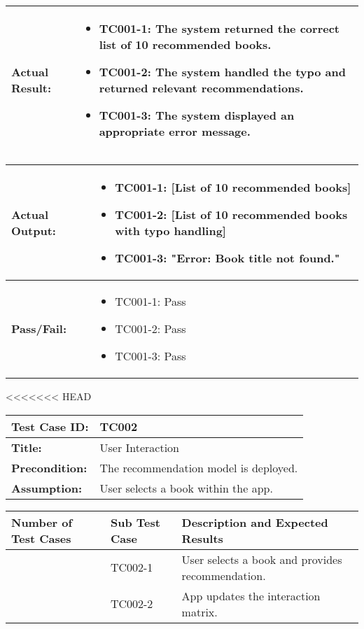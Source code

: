 \documentclass{article}
\begin{document}
\noindent
\begin{tabularx}{\textwidth}{|>{\raggedright\arraybackslash}p{4cm}|X|}
    \hline
    \textbf{Actual Result:} & 
    \begin{itemize}
        \item TC001-1: The system returned the correct list of 10 recommended books.
        \item TC001-2: The system handled the typo and returned relevant recommendations.
        \item TC001-3: The system displayed an appropriate error message.
    \end{itemize}
    \\ \hline
\end{tabularx}

\noindent
\begin{tabularx}{\textwidth}{|>{\raggedright\arraybackslash}p{4cm}|X|}
    \hline
    \textbf{Actual Output:} & 
    \begin{itemize}
        \item TC001-1: [List of 10 recommended books]
        \item TC001-2: [List of 10 recommended books with typo handling]
        \item TC001-3: "Error: Book title not found."
    \end{itemize}
    \\ \hline
    \textbf{Pass/Fail:} & 
    \begin{itemize}
        \item TC001-1: Pass
        \item TC001-2: Pass
        \item TC001-3: Pass
    \end{itemize}
    \\ \hline
\end{tabularx}

<<<<<<< HEAD
\noindent
\begin{tabularx}{\textwidth}{|>{\raggedright\arraybackslash}p{4cm}|X|}
    \hline
    \textbf{Test Case ID:} & TC002 \\ \hline
    \textbf{Title:} & User Interaction \\ \hline
    \textbf{Precondition:} & The recommendation model is deployed. \\ \hline
    \textbf{Assumption:} & User selects a book within the app. \\ \hline
\end{tabularx}

\noindent
\begin{tabularx}{\textwidth}{|>{\centering\arraybackslash}p{3cm}|>{\centering\arraybackslash}p{3cm}|X|}
    \hline
    \textbf{Number of Test Cases} & \textbf{Sub Test Case} & \textbf{Description and Expected Results} \\ \hline
    1 & TC002-1 & User selects a book and provides recommendation. \\ \hline
    2 & TC002-2 & App updates the interaction matrix. \\ \hline
\end{tabularx}
\end{document}
